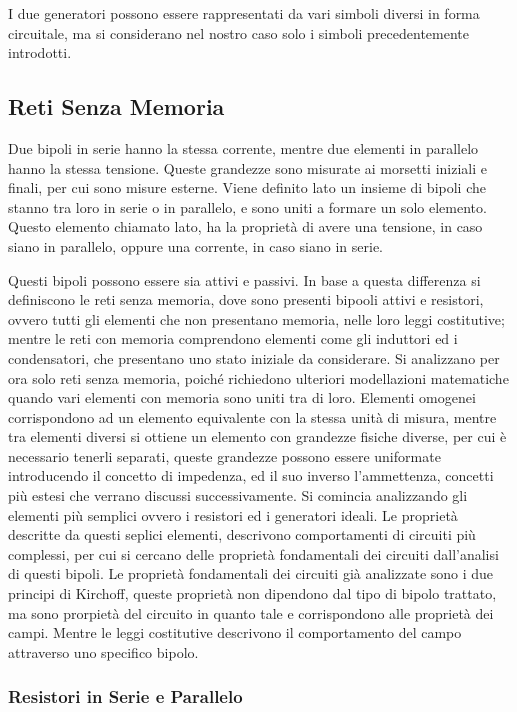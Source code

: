 \documentclass{article}
\numberwithin{equation}{subsection}
\begin{document}
I due generatori possono essere rappresentati da vari simboli diversi in forma circuitale, ma si considerano nel nostro caso solo i simboli precedentemente introdotti.  

\subsection{Reti Senza Memoria}

Due bipoli in serie hanno la stessa corrente, mentre due elementi in parallelo hanno la stessa tensione. Queste grandezze sono misurate ai morsetti iniziali e finali, per cui 
sono misure esterne. 
Viene definito lato un insieme di bipoli che stanno tra loro in serie o in parallelo, e sono uniti a formare un solo elemento. Questo elemento chiamato lato, ha la proprietà di avere 
una tensione, in caso siano in parallelo, oppure una corrente, in caso siano in serie. 

Questi bipoli possono essere sia attivi e passivi. In base a questa differenza si definiscono le reti senza memoria, dove sono presenti bipooli attivi e resistori, ovvero tutti 
gli elementi che non presentano memoria, nelle loro leggi costitutive; mentre le reti con memoria comprendono elementi come gli induttori ed i condensatori, che presentano 
uno stato iniziale da considerare. Si analizzano per ora solo reti senza memoria, poiché richiedono ulteriori modellazioni matematiche 
quando vari elementi con memoria sono uniti tra di loro. Elementi omogenei corrispondono ad un elemento equivalente con la stessa unità di misura, mentre tra elementi diversi 
si ottiene un elemento con grandezze fisiche diverse, per cui è necessario tenerli separati, queste grandezze possono essere uniformate introducendo il concetto di impedenza, 
ed il suo inverso l'ammettenza, concetti più estesi che verrano discussi successivamente. Si comincia analizzando gli elementi più semplici ovvero i resistori ed i generatori 
ideali. Le proprietà descritte da questi seplici elementi, descrivono comportamenti di circuiti più complessi, per cui si cercano delle proprietà fondamentali dei circuiti 
dall'analisi di questi bipoli. Le proprietà fondamentali dei circuiti già analizzate sono i due principi di Kirchoff, queste proprietà non dipendono dal tipo di bipolo trattato, 
ma sono prorpietà del circuito in quanto tale e corrispondono alle proprietà dei campi. Mentre le leggi costitutive descrivono il comportamento del campo attraverso uno 
specifico bipolo.   

\subsubsection{Resistori in Serie e Parallelo}
\end{document}
